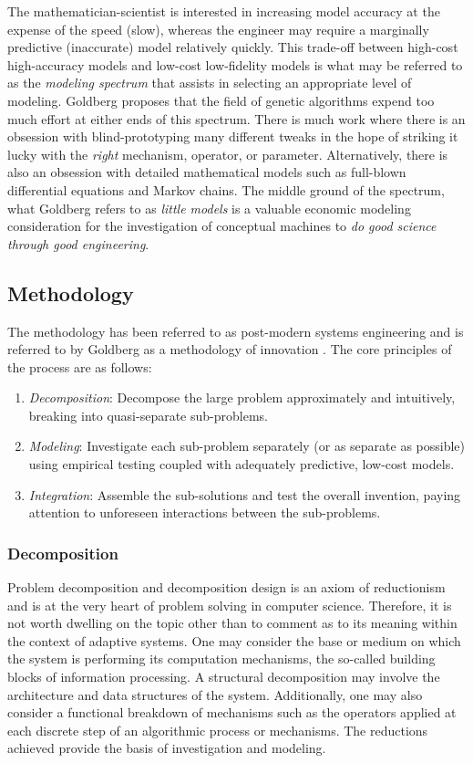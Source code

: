 \documentclass[a4paper, 11pt]{article}
\begin{document}
The mathematician-scientist is interested in increasing model accuracy at the expense of the speed (slow), whereas the engineer may require a marginally predictive (inaccurate) model relatively quickly. This trade-off between high-cost high-accuracy models and low-cost low-fidelity models is what may be referred to as the \emph{modeling spectrum} that assists in selecting an appropriate level of modeling. Goldberg proposes that the field of genetic algorithms expend too much effort at either ends of this spectrum. There is much work where there is an obsession with blind-prototyping many different tweaks in the hope of striking it lucky with the \emph{right} mechanism, operator, or parameter. Alternatively, there is also an obsession with detailed mathematical models such as full-blown differential equations and Markov chains. The middle ground of the spectrum, what Goldberg refers to as \emph{little models} is a valuable economic modeling consideration for the investigation of conceptual machines to \emph{do good science through good engineering}. 

\subsection{Methodology}
The methodology has been referred to as post-modern systems engineering and is referred to by Goldberg as a methodology of innovation \cite{Goldberg2004}. The core principles of the process are as follows: 

\begin{enumerate}
	\item \emph{Decomposition}: Decompose the large problem approximately and intuitively, breaking into quasi-separate sub-problems.
	\item \emph{Modeling}: Investigate each sub-problem separately (or as separate as possible) using empirical testing coupled with adequately predictive, low-cost models.
	\item \emph{Integration}: Assemble the sub-solutions and test the overall invention, paying attention to unforeseen interactions between the sub-problems.
\end{enumerate}

\subsubsection{Decomposition} 
Problem decomposition and decomposition design is an axiom of reductionism and is at the very heart of problem solving in computer science. Therefore, it is not worth dwelling on the topic other than to comment as to its meaning within the context of adaptive systems. One may consider the base or medium on which the system is performing its computation mechanisms, the so-called building blocks of information processing. A structural decomposition may involve the architecture and data structures of the system. Additionally, one may also consider a functional breakdown of mechanisms such as the operators applied at each discrete step of an algorithmic process or mechanisms. The reductions achieved provide the basis of investigation and modeling.
\end{document}
